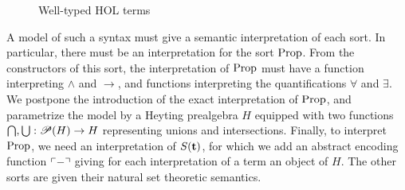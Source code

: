 \documentclass[a4paper,UKenglish,cleveref, autoref, thm-restate]{lipics-v2021}
\begin{document}
\begin{figure}[t]
\begin{mathpar}




  \end{mathpar}
   \label{fig:hol_terms}
   \caption{Well-typed HOL terms}   
  \end{figure}


A model of such a syntax must give a semantic interpretation of each sort. In particular, there must be an interpretation for the sort $\mathrm{Prop}$. From the constructors of this sort, the interpretation of $\mathrm{Prop}$ must have a function interpreting $\land$ and $\to$, and functions interpreting the quantifications $\forall$ and $\exists$. We postpone the introduction of the exact interpretation of $\mathrm{Prop}$, and parametrize the model by a Heyting prealgebra $H$ equipped with two functions $\bigcap,\bigcup : \mathscr{P} (H) \to H$ representing unions and intersections. Finally, to interpret $\mathrm{Prop}$, we need an interpretation of $S(\mathbf{t})$, for which we add an abstract encoding function $\ulcorner-\urcorner$ giving for each interpretation of a term an object of $H$.
The other sorts are given their natural set theoretic semantics.
\end{document}
